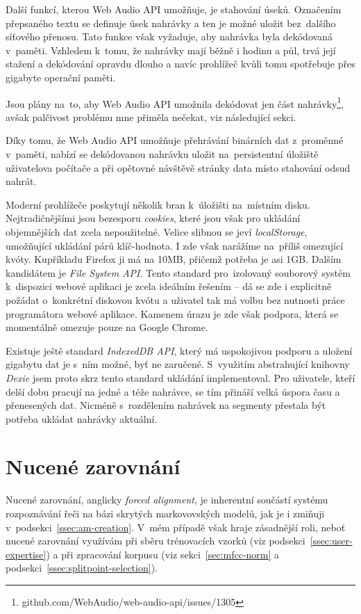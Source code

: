 Další funkcí, kterou Web Audio API umožňuje, je stahování úseků. Označením
přepsaného textu se definuje úsek nahrávky a ten je možné uložit bez~dalšího
síťového přenosu. Tato funkce však vyžaduje, aby nahrávka byla dekódovaná
v~paměti. Vzhledem k~tomu, že nahrávky mají běžně i hodinu a půl, trvá její
stažení a dekódování opravdu dlouho a navíc prohlížeč kvůli tomu spotřebuje přes
gigabyte operační paměti.

Jsou plány na~to, aby Web Audio API umožnila dekódovat jen část
nahrávky\footnote{github.com/WebAudio/web-audio-api/issues/1305}, avšak
palčivost problému mne přiměla nečekat, viz následující sekci.

Díky tomu, že Web Audio API umožňuje přehrávání binárních dat z~proměnné
v~paměti, nabízí se dekódovanou nahrávku uložit na~persistentní úložiště
uživatelova počítače a při opětovné návštěvě stránky data místo stahování odsud
nahrát.

Moderní prohlížeče poskytují několik bran k~úložišti na~místním disku.
Nejtradičnějšími jsou bezesporu \textit{cookies}, které jsou však pro ukládání
objemnějších dat zcela nepoužitelné. Velice slibnou se jeví
\textit{localStorage}, umožňující ukládání párů klíč-hodnota. I zde však
narážíme na~příliš omezující kvóty. Kupříkladu Firefox ji má na 10MB, přičemž
potřeba je asi 1GB. Dalším kandidátem je \textit{File System API}. Tento
standard pro~izolovaný souborový systém k~dispozici webové aplikaci je zcela
ideálním řešením -- dá se zde i explicitně požádat o~konkrétní diskovou kvótu a
uživatel tak má volbu bez nutnosti práce programátora webové aplikace. Kamenem
úrazu je zde však podpora, která se momentálně omezuje pouze na Google Chrome.

Existuje ještě standard \textit{IndexedDB API}, který má uspokojivou
podporu a uložení gigabytu dat je s~ním možné, byť ne zaručené. S~využitím
abstrahující knihovny \textit{Dexie} jsem proto skrz tento standard ukládání
implementoval. Pro uživatele, kteří delší dobu pracují na jedné a téže nahrávce,
se tím přináší velká úspora času a přenesených dat. Nicméně s~rozdělením
nahrávek na segmenty přestala být potřeba ukládat nahrávky aktuální.

\section{Nucené zarovnání}

Nucené zarovnání, anglicky {\em forced alignment}, je inherentní součástí
systému rozpoznávání řeči na bázi skrytých markovovských modelů, jak je i
zmiňuji v~podsekci~\ref{ssec:am-creation}. V~mém případě však hraje zásadnější
roli, neboť nucené zarovnání využívám při sběru trénovacích vzorků (viz
podsekci~\ref{ssec:user-expertise}) a při zpracování korpusu (viz
sekci~\ref{sec:mfcc-norm} a podsekci~\ref{ssec:splitpoint-selection}).

